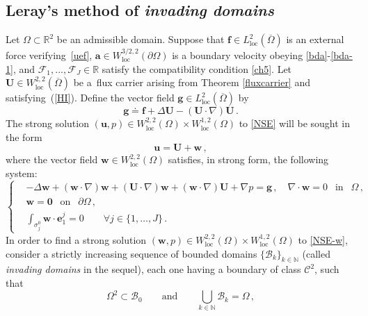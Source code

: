 \documentclass[11pt]{article}
\numberwithin{equation}{section}
\numberwithin{figure}{section}
\newcommand{\N}{\mathbb{N}}
\def\loc{{\mathrm{loc}}}
\def\N{{\mathbb N}}
\def\Fe{{\mathcal F}}
\def\fe{{\mathbf f}}
\def\0{{\mathbf 0}}
\def\ee{{\mathbf e}}
\def\ae{{\mathbf a}}
\def\fe{{\mathbf f}}
\begin{document}
\subsection{Leray's method of \textit{invading domains}}\label{proofs-sec}

Let $\Omega \subset \mathbb{R}^2$ be an admissible domain. Suppose that $\fe\in L_\loc^{2}(\overline\Omega)$ is an external force verifying~\eqref{uef}, $\ae\in W^{3/2,2}_\loc(\partial\Omega)$ is a boundary velocity obeying \eqref{bda}-\eqref{bda-1}, and
$\Fe_1,...,\Fe_J \in \mathbb{R}$ satisfy the compatibility condition \eqref{ch5}. Let
$\mathbf{U}\in W^{2,2}_{\loc}(\overline\Omega)$ be a~flux carrier arising from Theorem \ref{fluxcarrier} and satisfying~(\ref{HI}).
Define the vector field $\mathbf{g} \in L_\loc^2(\overline\Omega)$ by
$$
\mathbf{g} \doteq \mathbf{f} +   \Delta \mathbf{U} - (\mathbf{U} \cdot \nabla) \mathbf{U} \, .
$$
The strong solution $(\mathbf{u}, p) \in W_{\text{loc}}^{2,2}(\Omega) \times W_{\text{loc}}^{1,2}(\Omega)$ to \eqref{NSE} will be sought in the
form
\begin{equation}  \label{shift}
\mathbf{u} = \mathbf{U} + \mathbf{w} \, ,
\end{equation}
where the vector field $\mathbf{w} \in W_{\text{loc}}^{2,2}(\Omega)$ satisfies, in strong form,
the following system:
\begin{equation}  \label{NSE-w}
	\left\{
	\begin{aligned}
		&- \Delta \mathbf{w} + (\mathbf{w} \cdot \nabla) \mathbf{w} + (\mathbf{U} \cdot \nabla) \mathbf{w} +(\mathbf{w} \cdot \nabla) \mathbf{U} + \nabla p = \mathbf{g} \, , \quad \nabla \cdot \mathbf{w} = 0 \ \ \mbox{ in } \ \ \Omega \, , \\[4pt]
		&\mathbf{w} = \0 \ \ \mbox{ on } \ \ \partial \Omega \, , \\[4pt]
		&  	\int_{\sigma_j^0} \mathbf{w} \cdot \ee_1^j = 0 \qquad \forall j \in \{1,\dots,J \} \, .
	\end{aligned}
	\right.
\end{equation}
In order to find a strong solution $(\mathbf{w}, p) \in W_{\text{loc}}^{2,2}(\Omega) \times W_{\text{loc}}^{1,2}(\Omega)$ to \eqref{NSE-w}, consider a strictly increasing sequence of bounded domains $\{  \mathcal{B}_k \}_{k \in \mathbb{N}}$ (called \textit{invading domains} in the sequel), each one having a boundary of class $\mathcal{C}^{2}$, such that
\begin{equation}  \label{chp1}
	\Omega^2 \subset \mathcal{B}_0 \qquad \text{and} \qquad \bigcup\limits_{k\in \N}  \mathcal{B}_k=\Omega \, ,
\end{equation}
\end{document}
